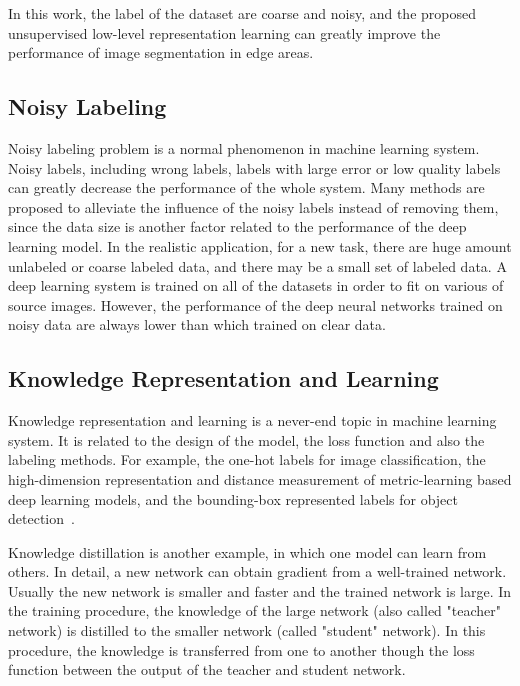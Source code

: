 \documentclass[10pt,twocolumn,letterpaper]{article}
\begin{document}
In this work, the label of the dataset are coarse and noisy, and the proposed unsupervised low-level representation learning can greatly improve the performance of image segmentation in edge areas. 


\subsection{Noisy Labeling}
Noisy labeling problem is a normal phenomenon in machine learning system. 
Noisy labels, including wrong labels, labels with large error or low quality labels can greatly decrease the performance of the whole system. 
Many methods are proposed to alleviate the influence of the noisy labels instead of removing them, since the data size is another factor related to the performance of the deep learning model. 
In the realistic application, for a new task, there are huge amount unlabeled or coarse labeled data, and there may be a small set of labeled data. A deep learning system is trained on all of the datasets in order to fit on various of source images. 
However, the performance of the deep neural networks trained on noisy data are always lower than which trained on clear data. 



\subsection{Knowledge Representation and Learning}

Knowledge representation and learning is a never-end topic in machine learning system. It is related to the design of the model, the loss function and also the labeling methods. 
For example, the one-hot labels for image classification, the high-dimension representation and distance measurement of metric-learning based deep learning models, and the bounding-box represented labels for object detection~\cite{Girshick_2015_ICCV}. 

Knowledge distillation is another example, in which one model can learn from others. 
In detail, a new network can obtain gradient from a well-trained network. Usually the new network is smaller and faster and the trained network is large. In the training procedure, the knowledge of the large network (also called "teacher" network) is distilled to the smaller network (called "student" network). 
In this procedure, the knowledge is transferred from one to another though the loss function between the output of the teacher and student network. 
\end{document}
